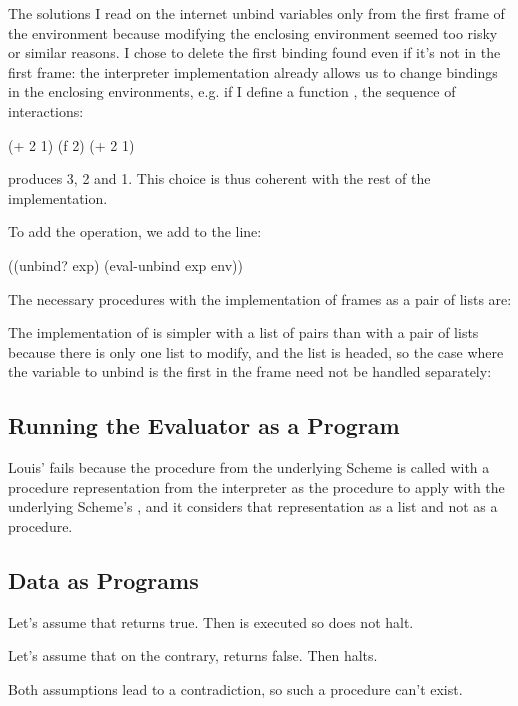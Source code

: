 \begin{exe}[4.13]
    The solutions I read on the internet unbind variables only from the first 
    frame of the environment because modifying the enclosing environment seemed 
    too risky or similar reasons. I chose to delete the first binding found even 
    if it’s not in the first frame: the interpreter implementation already 
    allows us to change bindings in the enclosing environments, e.g. if I define 
    a function
    , the sequence of interactions:
    \begin{cscm}
	(+ 2 1)
	(f 2)
	(+ 2 1)
    \end{cscm}
    produces 3, 2 and 1. This choice is thus coherent with the rest of the 
    implementation.

    To add the  operation, we add to  the line:
    \begin{cscm}
	((unbind? exp) (eval-unbind exp env))
    \end{cscm}
    The necessary procedures with the implementation of frames as a pair of 
    lists are:

    The implementation of  is simpler with 
    a list of pairs than with a pair of lists because there is only one list to 
    modify, and the list is headed, so the case where the variable to unbind is 
    the first in the frame need not be handled separately:
\end{exe}

\subsection{Running the Evaluator as a Program}

\begin{exe}[4.14]
    Louis’  fails because the  procedure from the underlying 
    Scheme is called with a procedure representation from the interpreter as the 
    procedure to apply with the underlying Scheme’s , and it 
    considers that representation as a list and not as a procedure.
\end{exe}

\subsection{Data as Programs}

\begin{exe}[4.15]
    Let’s assume that  returns true. Then 
     is executed so  does not halt.

    Let’s assume that on the contrary,  returns false. 
    Then  halts.

    Both assumptions lead to a contradiction, so such a  procedure 
    can’t exist.
\end{exe}

